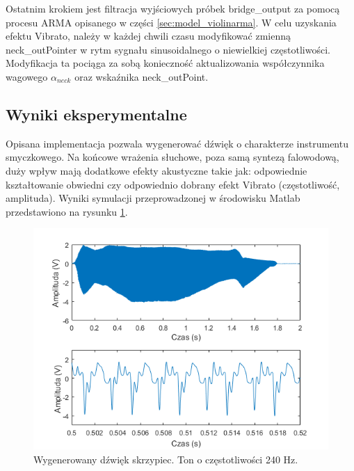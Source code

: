 Ostatnim krokiem jest filtracja wyjściowych próbek bridge\_output za pomocą procesu ARMA opisanego w części \ref{sec:model_violinarma}.
W celu uzyskania efektu Vibrato, należy w każdej chwili czasu modyfikować zmienną neck\_outPointer w rytm sygnału sinusoidalnego o niewielkiej częstotliwości. Modyfikacja ta pociąga za sobą konieczność aktualizowania współczynnika wagowego $\alpha _{neck}$ oraz wskaźnika neck\_outPoint. 
\subsection{Wyniki eksperymentalne}
Opisana implementacja pozwala wygenerować dźwięk o charakterze instrumentu smyczkowego. Na końcowe wrażenia słuchowe, poza samą syntezą falowodową, duży wpływ mają dodatkowe efekty akustyczne takie jak: odpowiednie kształtowanie obwiedni czy odpowiednio dobrany efekt Vibrato (częstotliwość, amplituda). Wyniki symulacji przeprowadzonej w środowisku Matlab przedstawiono na rysunku \ref{rys:model_violin_matlab}.
\begin{figure}[H]
	\centering
	\includegraphics[width=12cm]{grafiki/model_violin_matlab}
	\captionsetup{justification=centering}
	\caption{Wygenerowany dźwięk skrzypiec. Ton o częstotliwości 240 Hz.}
	\label{rys:model_violin_matlab}
\end{figure}
